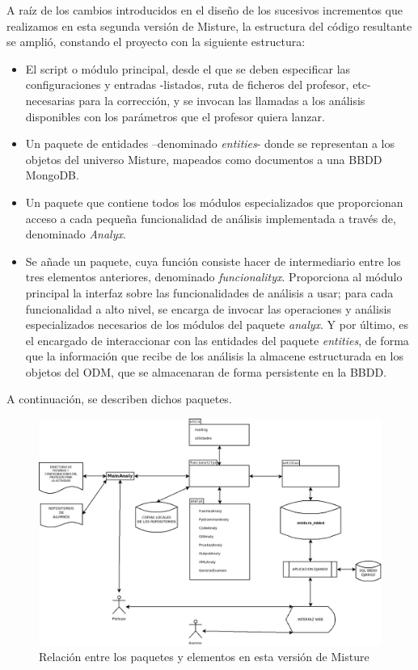 A raíz de los cambios introducidos en el diseño de los sucesivos incrementos que realizamos en esta segunda versión de Misture, la estructura del código resultante se amplió, constando el proyecto con la siguiente estructura:\\

\begin{itemize}
\item El script o módulo principal, desde el que se deben especificar las configuraciones y entradas -listados, ruta de ficheros del profesor, etc- necesarias para la corrección, y se invocan las llamadas a los análisis disponibles con los parámetros que el profesor quiera lanzar.

\item Un paquete de entidades –denominado \textit{entities}- donde se representan a los objetos del universo Misture, mapeados como documentos a una BBDD MongoDB.

\item Un paquete que contiene todos los módulos especializados que proporcionan acceso a cada pequeña funcionalidad de análisis implementada a través de, denominado \textit{Analyx}.

\item Se añade un paquete, cuya función consiste hacer de intermediario entre los tres elementos anteriores, denominado \textit{funcionalityx}. Proporciona al módulo principal la interfaz sobre las funcionalidades de análisis a usar; para cada funcionalidad a alto nivel, se encarga de invocar las operaciones y análisis especializados necesarios de los módulos del paquete \textit{analyx}. Y por último, es el encargado de interaccionar con las entidades del paquete \textit{entities}, de forma que la información que recibe de los análisis la almacene estructurada en los objetos del ODM, que se almacenaran de forma persistente en la BBDD.
\end{itemize}

A continuación, se describen dichos paquetes.

\begin{figure}[H]
   \centering
   \includegraphics[width=16cm]{img/Diagram3_iteracion2}
   \caption{Relación entre los paquetes y elementos en esta versión de Misture}
   \label{figura:regex}
\end{figure}



